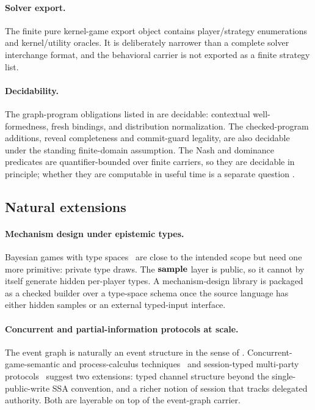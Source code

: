 \paragraph{Solver export.}  The finite pure kernel-game export object
contains player/strategy enumerations and kernel/utility oracles.  It is
deliberately narrower than a complete solver interchange format, and the
behavioral carrier is not exported as a finite strategy list.

\paragraph{Decidability.}  The graph-program obligations listed in
 are decidable: contextual well-formedness, fresh
bindings, and distribution normalization.  The checked-program
additions, reveal completeness and commit-guard legality, are also
decidable under the standing finite-domain assumption.  The Nash and
dominance predicates are quantifier-bounded over finite carriers, so
they are decidable in principle; whether they are computable in useful
time is a separate question \citep{DaskalakisGoldbergPapadimitriou2009}.

\subsection{Natural extensions}
\label{sec:disc:ext}

\paragraph{Mechanism design under epistemic types.}
Bayesian games with type
spaces~\citep{Harsanyi1967,MyersonGameTheory} are close to the
intended scope but need one more primitive: private type draws.
The $\mathbf{sample}$ layer is public, so it cannot by itself
generate hidden per-player types.  A mechanism-design library is packaged
as a checked  builder over a type-space
schema once the source language has either hidden samples or an
external typed-input interface.

\paragraph{Concurrent and partial-information protocols at scale.}
The event graph is naturally an event structure in the sense of
\citet{Winskel1987EventStructures,NielsenPlotkinWinskel1981}.
Concurrent-game-semantic and process-calculus
techniques~\citep{RideauWinskel2011Concurrent,
CastellanYoshidaSessionGame,
AbramskyJagadeesan1994,HylandOng2000PCF,Milner1999PiCalculus}
and session-typed multi-party
protocols~\citep{HondaYoshidaCarbone2008MPST} suggest two
extensions: typed channel structure beyond the
single-public-write SSA convention, and a richer notion of session
that tracks delegated authority.  Both are layerable on top of the
event-graph carrier.

